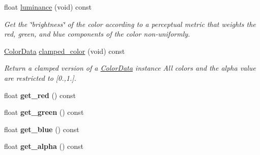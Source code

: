 \begin{DoxyCompactItemize}
\item 
float \hyperlink{classimage__tools_1_1ColorData_a9bea35824e209d2c216739fdc8b9bf3f}{luminance} (void) const \hypertarget{classimage__tools_1_1ColorData_a9bea35824e209d2c216739fdc8b9bf3f}{}\label{classimage__tools_1_1ColorData_a9bea35824e209d2c216739fdc8b9bf3f}

\begin{DoxyCompactList}\small\item\em Get the \char`\"{}brightness\char`\"{} of the color according to a perceptual metric that weights the red, green, and blue components of the color non-\/uniformly. \end{DoxyCompactList}\item 
\hyperlink{classimage__tools_1_1ColorData}{Color\+Data} \hyperlink{classimage__tools_1_1ColorData_add7ac66b4e579f06f59f03c2206a0429}{clamped\+\_\+color} (void) const \hypertarget{classimage__tools_1_1ColorData_add7ac66b4e579f06f59f03c2206a0429}{}\label{classimage__tools_1_1ColorData_add7ac66b4e579f06f59f03c2206a0429}

\begin{DoxyCompactList}\small\item\em Return a clamped version of a \hyperlink{classimage__tools_1_1ColorData}{Color\+Data} instance All colors and the alpha value are restricted to \mbox{[}0.,1.\mbox{]}. \end{DoxyCompactList}\item 
float {\bfseries get\+\_\+red} () const \hypertarget{classimage__tools_1_1ColorData_af88bac2ff3c3e62efda953a9714589f3}{}\label{classimage__tools_1_1ColorData_af88bac2ff3c3e62efda953a9714589f3}

\item 
float {\bfseries get\+\_\+green} () const \hypertarget{classimage__tools_1_1ColorData_ac16f07bdc5bbedd02d2144ca3ce2c886}{}\label{classimage__tools_1_1ColorData_ac16f07bdc5bbedd02d2144ca3ce2c886}

\item 
float {\bfseries get\+\_\+blue} () const \hypertarget{classimage__tools_1_1ColorData_a880a3a0451a4e1a993b4f5c35874797c}{}\label{classimage__tools_1_1ColorData_a880a3a0451a4e1a993b4f5c35874797c}

\item 
float {\bfseries get\+\_\+alpha} () const \hypertarget{classimage__tools_1_1ColorData_ac3998b1e84bc22cf66bebce79aeb2295}{}\label{classimage__tools_1_1ColorData_ac3998b1e84bc22cf66bebce79aeb2295}

\end{DoxyCompactItemize}
